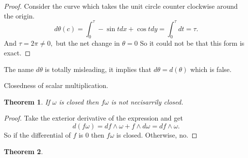 \documentclass[letter]{article}
\newtheorem{theorem}{Theorem}
\newenvironment{menumerate}{%
  \edef\backupindent{\the\parindent}%
  \enumerate%
  \setlength{\parindent}{\backupindent}%
}{\endenumerate}
\begin{document}
\begin{menumerate}
\begin{proof}
	Consider the curve which takes the unit circle counter clockwise around the origin. 
	\begin{equation}
	 d\theta(c)= \int_0^\tau -\sin t dx + \cos t dy = \int_0^\tau dt = \tau.
	\end{equation}
	And $\tau = 2\pi \neq 0,$ but the net change in $\theta = 0$ So it could not be that this form is exact. 
\end{proof}
	The name $d\theta$ is totally misleading, it implies that $d\theta = d(\theta)$ which is false. 
	\setcounter{enumi}{67}
	\item Closedness of scalar multiplication.
	 \begin{theorem}
		If $\omega$ is closed then $f\omega$ is not necisarrily closed.	
	\end{theorem}
	\begin{proof}
		Take the exterior derivative of the expression and get
		\begin{equation}
		d(f\omega) = df \wedge \omega + f \wedge d\omega = df \wedge \omega.
		\end{equation}
		So if the differential of $f$ is $0$ then $f\omega$ is closed. Otherwise, no.
	\end{proof}
	\begin{theorem}
		
	\end{theorem}
\end{menumerate}
\end{document}
